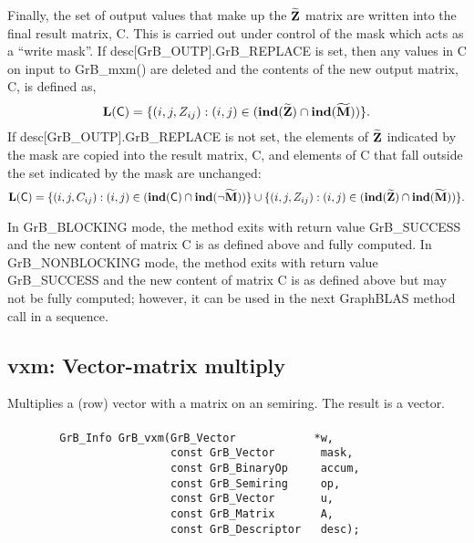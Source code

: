 Finally, the set of output values that make up the ${\bf \widetilde{Z}}$ 
matrix are written into the final result matrix, {\sf C}. 
This is carried out under control of the mask which acts as a ``write mask''.
If {\sf desc[GrB\_OUTP].GrB\_REPLACE} is set, then any values in {\sf C} on 
input to {\sf GrB\_mxm()} are deleted and the contents of the new output matrix,
{\sf C}, is defined as,
\[ 
\bold{L}({\sf C}) = \{(i,j,Z_{ij}) : (i,j) \in (\bold{ind}({\bf \widetilde{Z}}) 
\cap \bold{ind}({\bf \widetilde{M}})) \}. 
\]
If {\sf desc[GrB\_OUTP].GrB\_REPLACE} is not set, the elements of 
${\bf \widetilde{Z}}$ indicated by the mask are copied into the result 
matrix, {\sf C}, and elements of {\sf C} that fall outside the set 
indicated by the mask are unchanged:
\[ 
\bold{L}({\sf C}) = \{(i,j,C_{ij}) : (i,j) \in (\bold{ind}({\bf \sf C}) \cap \bold{ind}(\neg {\bf \widetilde{M}})) \} \cup \{(i,j,Z_{ij}) : (i,j) \in (\bold{ind}({\bf \widetilde{Z}}) \cap \bold{ind}({\bf \widetilde{M}})) \}. 
\]

In {\sf GrB\_BLOCKING} mode, the method exits with return value {\sf GrB\_SUCCESS} and the new content of matrix {\sf C} is as defined above and fully computed.
In {\sf GrB\_NONBLOCKING} mode, the method exits with return value {\sf GrB\_SUCCESS} and the new content of matrix {\sf C} is as defined above but may not be fully computed; however, it can be used in the next GraphBLAS 
method call in a sequence.


\subsection{{\sf vxm}: Vector-matrix multiply}

Multiplies a (row) vector with a matrix on an semiring. The result is a vector.

\paragraph{\syntax}

\begin{verbatim}
        GrB_Info GrB_vxm(GrB_Vector            *w,
                         const GrB_Vector       mask,
                         const GrB_BinaryOp     accum,
                         const GrB_Semiring     op,
                         const GrB_Vector       u, 
                         const GrB_Matrix       A,
                         const GrB_Descriptor   desc);
\end{verbatim}

